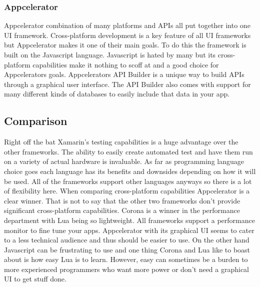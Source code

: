 \documentclass[onecolumn, draftclsnofoot,10pt, compsoc]{IEEEtran}
\begin{document}
		\subsubsection{Appcelerator}
			Appcelerator combination of many platforms and APIs all put together into one UI framework.
			Cross-platform development is a key feature of all UI frameworks but Appcelerator makes it one of their main goals.
			To do this the framework is built on the Javascript language.
			Javascript is hated by many but its cross-platform capabilities make it nothing to scoff at and a good choice for Appcelerators goals.
			Appcelerators API Builder is a unique way to build APIs through a graphical user interface.
			The API Builder also comes with support for many different kinds of databases to easily include that data in your app\cite{appcelerator_overview}.

	\subsection{Comparison}
		Right off the bat Xamarin's testing capabilities is a huge advantage over the other frameworks.
		The ability to easily create automated test and have them run on a variety of actual hardware is invaluable.
		As far as programming language choice goes each language has its benefits and downsides depending on how it will be used.
		All of the frameworks support other languages anyways so there is a lot of flexibility here.
		When comparing cross-platform capabilities Appcelerator is a clear winner.
		That is not to say that the other two frameworks don't provide significant cross-platform capabilities.
		Corona is a winner in the performance department with Lua being so lightweight.
		All frameworks support a performance monitor to fine tune your apps.
		Appcelerator with its graphical UI seems to cater to a less technical audience and thus should be easier to use.
		On the other hand Javascript can be frustrating to use and one thing Corona and Lua like to boast about is how easy Lua is to learn.
		However, easy can sometimes be a burden to more experienced programmers who want more power or don't need a graphical UI to get stuff done.
		
\end{document}
